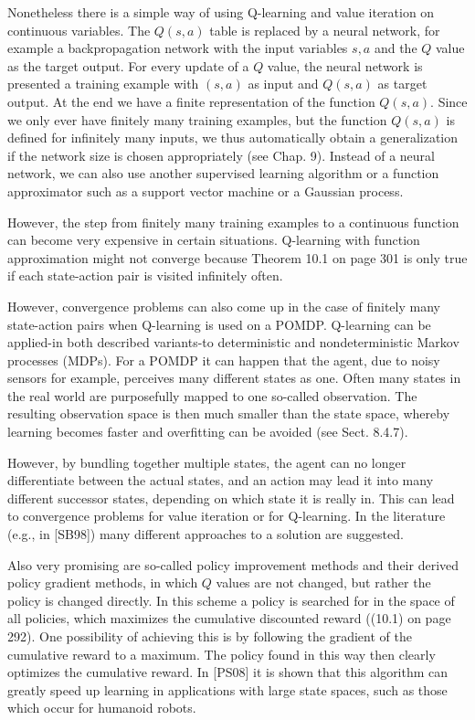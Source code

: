 \documentclass[10pt]{book}
\begin{document}
\begin{center}
\begin{enumerate}
\begin{center}
\begin{center}
\begin{center}
\begin{center}
\begin{center}
Nonetheless there is a simple way of using Q-learning and value iteration on continuous variables. The $Q(s, a)$ table is replaced by a neural network, for example a backpropagation network with the input variables $s, a$ and the $Q$ value as the target output. For every update of a $Q$ value, the neural network is presented a training example with $(s, a)$ as input and $Q(s, a)$ as target output. At the end we have a finite representation of the function $Q(s, a)$. Since we only ever have finitely many training examples, but the function $Q(s, a)$ is defined for infinitely many inputs, we thus automatically obtain a generalization if the network size is chosen appropriately (see Chap. 9). Instead of a neural network, we can also use another supervised learning algorithm or a function approximator such as a support vector machine or a Gaussian process.

However, the step from finitely many training examples to a continuous function can become very expensive in certain situations. Q-learning with function approximation might not converge because Theorem 10.1 on page 301 is only true if each state-action pair is visited infinitely often.

However, convergence problems can also come up in the case of finitely many state-action pairs when Q-learning is used on a POMDP. Q-learning can be applied-in both described variants-to deterministic and nondeterministic Markov processes (MDPs). For a POMDP it can happen that the agent, due to noisy sensors for example, perceives many different states as one. Often many states in the real world are purposefully mapped to one so-called observation. The resulting observation space is then much smaller than the state space, whereby learning becomes faster and overfitting can be avoided (see Sect. 8.4.7).

However, by bundling together multiple states, the agent can no longer differentiate between the actual states, and an action may lead it into many different successor states, depending on which state it is really in. This can lead to convergence problems for value iteration or for Q-learning. In the literature (e.g., in [SB98]) many different approaches to a solution are suggested.

Also very promising are so-called policy improvement methods and their derived policy gradient methods, in which $Q$ values are not changed, but rather the policy is changed directly. In this scheme a policy is searched for in the space of all policies, which maximizes the cumulative discounted reward ((10.1) on page 292). One possibility of achieving this is by following the gradient of the cumulative reward to a maximum. The policy found in this way then clearly optimizes the cumulative reward. In [PS08] it is shown that this algorithm can greatly speed up learning in applications with large state spaces, such as those which occur for humanoid robots.


\end{center}
\end{center}
\end{center}
\end{center}
\end{center}
\end{enumerate}
\end{center}
\end{document}
